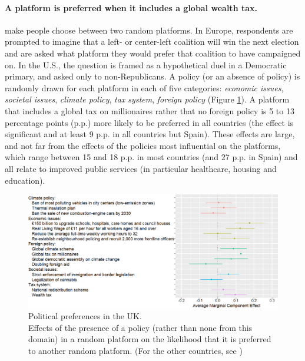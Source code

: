 \documentclass[12pt,english]{article}
\begin{document}
\paragraph{A platform is preferred when it includes a global wealth tax.} \citet{fabre_international_2023} make people choose between two random platforms. In Europe, respondents are prompted to imagine that a left- or center-left coalition will win the next election and are asked what platform they would prefer that coalition to have campaigned on. In the U.S., the question is framed as a hypothetical duel in a Democratic primary, and asked only to non-Republicans. A policy (or an absence of policy) is randomly drawn for each platform in each of five categories: \textit{economic issues}, \textit{societal issues}, \textit{climate policy}, \textit{tax system}, \textit{foreign policy} (Figure \ref{fig:ca_r}). 
A platform that includes a global tax on millionaires rather that no foreign policy is 5 to 13 percentage points (p.p.) more likely to be preferred in all countries (the effect is significant and at least 9 p.p. in all countries but Spain). 
These effects are large, and not far from the effects of the policies most influential on the platforms, which range between 15 and 18 p.p. in most countries (and 27 p.p. in Spain) and all relate to improved public services (in particular healthcare, housing and education). 

\begin{figure}[b!] 
    \caption[Preferences for various policies in political platforms in the UK]{Political preferences in the UK. \\ Effects of the presence of a policy (rather than none from this domain) in a random platform on the likelihood that it is preferred to another random platform. (For the other countries, see \citealp{fabre_international_2023})}\label{fig:ca_r}
      \includegraphics[width=\textwidth]{../figures/UK/ca_r.png}
\end{figure}
\end{document}
